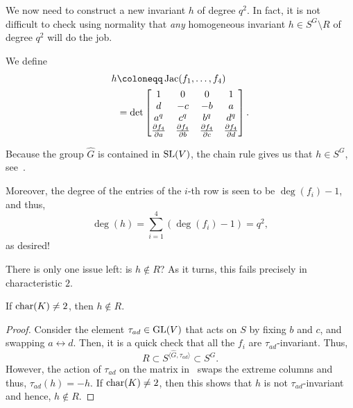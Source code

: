 \documentclass[12pt]{article}
\begin{document}
	We now need to construct a new invariant $h$ of degree $q^{2}$. 
	In fact, it is not difficult to check using normality that \emph{any} homogeneous invariant $h \in S^{G} \setminus R$ of degree $q^{2}$ will do the job.

	We define
	\begin{align} 
		h &\coloneqq \Jac(f_{1}, \ldots, f_{4}) \nonumber \\
		&= \det 
		\begin{bmatrix}
			1 & 0 & 0 & 1 \\
			d & -c & -b & a \\
			a^{q} & c^{q} & b^{q} & d^{q} \\
			\frac{\partial f_{4}}{\partial a} & \frac{\partial f_{4}}{\partial b} & \frac{\partial f_{4}}{\partial c} & \frac{\partial f_{4}}{\partial d} \\
		\end{bmatrix}.
		\label{eq:002}
	\end{align}

	Because the group $\widehat{G}$ is contained in $\operatorname{SL}(V)$, the chain rule gives us that $h \in S^{G}$, see~\Cite[Proposition 1.5.6]{Smith:PolynomialInvariantsBook}. 

	Moreover, the degree of the entries of the $i$-th row is seen to be $\deg(f_{i}) - 1$, and thus,
	\begin{equation*} 
		\deg(h) = \sum_{i = 1}^{4} (\deg(f_{i}) - 1) = \boxed{q^{2}},
	\end{equation*}
	as desired!

	There is only one issue left: is $h \notin R$? As it turns, this fails precisely in characteristic $2$.

	\begin{thm}
		If $\operatorname{char}(K) \neq 2$, then $h \notin R$.
	\end{thm}
	\begin{proof} 
		Consider the element $\tau_{ad} \in \operatorname{GL}(V)$ that acts on $S$ by fixing $b$ and $c$, and swapping $a \leftrightarrow d$. 
		Then, it is a quick check that all the $f_{i}$ are $\tau_{ad}$-invariant. 
		Thus,
		\begin{equation*} 
			R \subset S^{\langle \widehat{G}, \tau_{ad} \rangle} \subset S^{G}.
		\end{equation*}
		However, the action of $\tau_{ad}$ on the matrix in~ swaps the extreme columns and thus, $\tau_{ad}(h) = -h$. 
		If $\operatorname{char}(K) \neq 2$, then this shows that $h$ is not $\tau_{ad}$-invariant and hence, $h \notin R$.
	\end{proof}
\end{document}
